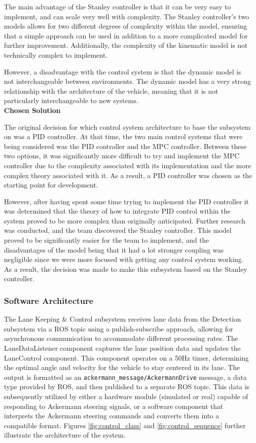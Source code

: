 \documentclass[titlepage, draft]{article}
\begin{document}
{The main advantage of the Stanley controller is that it can be very easy to implement, and can scale very well with complexity. The Stanley controller's two models allows for two different degrees of complexity within the model, ensuring that a simple approach can be used in addition to a more complicated model for further improvement. Additionally, the complexity of the kinematic model is not technically complex to implement.

However, a disadvantage with the control system is that the dynamic model is not interchangeable between environments. The dynamic model has a very strong relationship with the architecture of the vehicle, meaning that it is not particularly interchangeable to new systems.
\\

\textbf{Chosen Solution}

The original decision for which control system architecture to base the subsystem on was a PID controller. At that time, the two main control systems that were being considered was the PID controller and the MPC controller. Between these two options, it was significantly more difficult to try and implement the MPC controller due to the complexity associated with its implementation and the more complex theory associated with it. As a result, a PID controller was chosen as the starting point for development.

However, after having spent some time trying to implement the PID controller it was determined that the theory of how to integrate PID control within the system proved to be more complex than originally anticipated. Further research was conducted, and the team discovered the Stanley controller. This model proved to be significantly easier for the team to implement, and the disadvantages of the model being that it had a lot stronger coupling was negligible since we were more focused with getting any control system working. As a result, the decision was made to make this subsystem based on the Stanley controller.

\subsubsection{Software Architecture}

The Lane Keeping \& Control subsystem receives lane data from the Detection subsystem via a ROS topic using a publish-subscribe approach, allowing for asynchronous communication to accommodate different processing rates. The LaneDataListener component captures the lane position data and updates the LaneControl component. This component operates on a 50Hz timer, determining the optimal angle and velocity for the vehicle to stay centered in its lane. The output is formatted as an
\texttt{ackermann\_message/AckermannDrive} message,
a data type provided by ROS, and then published to a separate ROS topic. This data is subsequently utilized by either a hardware module (simulated or real) capable of responding to Ackermann steering signals, or a software component that interprets the Ackermann steering commands and converts them into a compatible format. Figures \ref{fig:control_class} and \ref{fig:control_sequence} further illustrate the architecture of the system.


}
\end{document}

